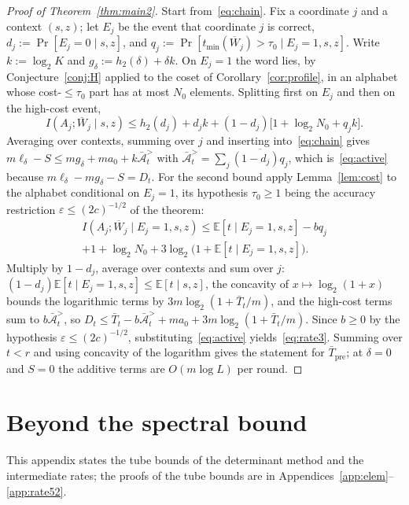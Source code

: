 \documentclass[aps,prx,twocolumn,superscriptaddress,nofootinbib,longbibliography]{revtex4-2}
\theoremstyle{plain}
\theoremstyle{definition}
\theoremstyle{remark}
\newcommand{\Tpre}{T_{\mathrm{pre}}}
\newcommand{\E}{\mathbb{E}}
\begin{document}
\begin{proof}[Proof of Theorem~\ref{thm:main2}]
Start from~\eqref{eq:chain}. Fix a coordinate $j$ and a context $(s,z)$; let $E_j$ be the event that coordinate $j$ is correct, $d_j:=\Pr[E_j=0\mid s,z]$, and $q_j:=\Pr[t_{\min}(\overline W_j)>\tau_0\mid E_j=1,s,z]$. Write $k:=\log_2K$ and $g_\delta:=h_2(\delta)+\delta k$. On $E_j=1$ the word lies, by Conjecture~\ref{conj:H} applied to the coset of Corollary~\ref{cor:profile}, in an alphabet whose cost-$\le\tau_0$ part has at most $N_0$ elements. Splitting first on $E_j$ and then on the high-cost event,
\[
I(A_j;\overline W_j\mid s,z)\le h_2(d_j)+d_jk+(1-d_j)\big[1+\log_2N_0+q_jk\big].
\]
Averaging over contexts, summing over $j$ and inserting into~\eqref{eq:chain} gives $m\ell_\delta-S\le mg_\delta+ma_0+k\bar{\mathcal A}^{>}_t$ with $\bar{\mathcal A}^{>}_t=\sum_j\overline{(1-d_j)q_j}$, which is~\eqref{eq:active} because $m\ell_\delta-mg_\delta-S=D_t$. For the second bound apply Lemma~\ref{lem:cost} to the alphabet conditional on $E_j=1$, its hypothesis $\tau_0\ge1$ being the accuracy restriction $\varepsilon\le(2c)^{-1/2}$ of the theorem:
\begin{multline*}
I(A_j;\overline W_j\mid E_j=1,s,z)\le\E[t\mid E_j=1,s,z]-bq_j\\+1+\log_2N_0+3\log_2\big(1+\E[t\mid E_j=1,s,z]\big).
\end{multline*}
Multiply by $1-d_j$, average over contexts and sum over $j$: $(1-d_j)\E[t\mid E_j=1,s,z]\le\E[t\mid s,z]$, the concavity of $x\mapsto\log_2(1+x)$ bounds the logarithmic terms by $3m\log_2(1+\bar T_t/m)$, and the high-cost terms sum to $b\bar{\mathcal A}^{>}_t$, so $D_t\le\bar T_t-b\bar{\mathcal A}^{>}_t+ma_0+3m\log_2(1+\bar T_t/m)$. Since $b\ge0$ by the hypothesis $\varepsilon\le(2c)^{-1/2}$, substituting~\eqref{eq:active} yields~\eqref{eq:rate3}. Summing over $t<r$ and using concavity of the logarithm gives the statement for $\bar\Tpre$; at $\delta=0$ and $S=0$ the additive terms are $O(m\log L)$ per round.
\end{proof}

\section{Beyond the spectral bound}\label{app:beyond}

This appendix states the tube bounds of the determinant method and the intermediate rates; the proofs of the tube bounds are in Appendices~\ref{app:elem}--\ref{app:rate52}.
\end{document}

